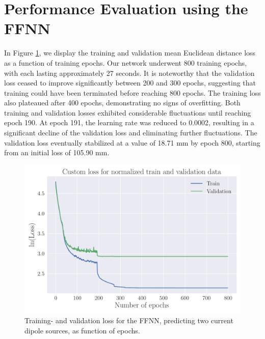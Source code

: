 \documentclass[a4paper, UKenglish, 11pt]{uiomaster}
\begin{document}
\section{Performance Evaluation using the FFNN}
In Figure \ref{fig:two_dipole_result_FFNN}, we display the training and validation mean Euclidean distance loss as a function of training epochs. Our network underwent 800 training epochs, with each lasting approximately 27 seconds. It is noteworthy that the validation loss ceased to improve significantly between 200 and 300 epochs, suggesting that training could have been terminated before reaching 800 epochs. The training loss also plateaued after 400 epochs, demonstrating no signs of overfitting. Both training and validation losses exhibited considerable fluctuations until reaching epoch 190. At epoch 191, the learning rate was reduced to 0.0002, resulting in a significant decline of the validation loss and eliminating further fluctuations. The validation loss eventually stabilized at a value of 18.71 mm by epoch 800, starting from an initial loss of 105.90 mm.



\begin{figure}[!htb]
    \centering
    \includegraphics[width=\linewidth]{figures/NN_two_dipole/Custom_Loss_simple_last_run_old_std_2_dipoles_32_0.001_0.35_0.1_0_800_(0).pdf}
    \caption{Training- and validation loss for the FFNN, predicting two current dipole sources, as function of epochs.}
    \label{fig:two_dipole_result_FFNN}
\end{figure}
\end{document}
